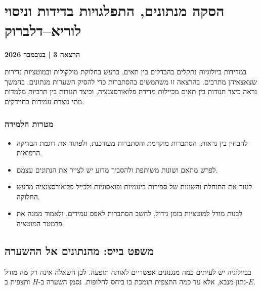 
\chapter{הסקה מנתונים, התפלגויות בדידות וניסוי לוריא--דלברוק}\label{chap:he03}
\noindent\textbf{הרצאה 3 \enspace| בנובמבר 2026}

במדידות ביולוגיות נתקלים בהבדלים בין תאים, ברעש בחלוקת מולקולות ובמוטציות נדירות שצאצאיהן מתרבים. בהרצאה זו משתמשים בהסתברות כדי להסיק השערות מנתונים. בהמשך נראה כיצד תנודות בין תאים מכיילות מדידת פלואורסצנציה, וכיצד תנודות בין תרביות מלמדות מתי נוצרת עמידות בחיידקים.

\subsection*{מטרות הלמידה}
\begin{itemize}
\item להבחין בין נראות, הסתברות מוקדמת והסתברות מעודכנת, ולפתור את דוגמת הבדיקה הרפואית.
\item לפרש מתאם ושונות משותפת ולהסביר מדוע יש לצייר את הנתונים עצמם.
\item לגזור את התוחלת והשונות של ספירות בינומיות ופואסוניות ולכייל פלואורסצנציה מרעש החלוקה.
\item לבנות מודל למוטציות בזמן גידול, לחשב הסתברות לאפס עמידים, ולאמוד ממנה את פרמטר המוטציה.
\end{itemize}

\section{משפט בייס: מהנתונים אל ההשערה}\label{sec:he03-bayes}
בביולוגיה יש לעיתים כמה מנגנונים אפשריים לאותה תופעה. לכן השאלה אינה רק מה מודל נתון מנבא, אלא עד כמה התצפית תומכת בו ביחס לחלופות. נסמן השערה ב-$H$ ותצפית ב-$E$.

